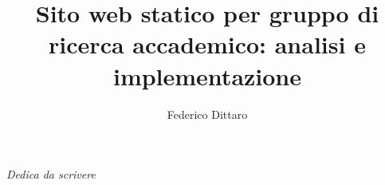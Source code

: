 \documentclass[target=bach,aauheader=]{thud}
\title{Sito web statico per gruppo di ricerca accademico: analisi e implementazione}
\author{Federico Dittaro}
\begin{document}
\maketitle

\newpage 
\begin{flushright}
     
    \textit{Dedica da scrivere}
\end{flushright} 
 
\tableofcontents



\mainmatter


\end{document}
